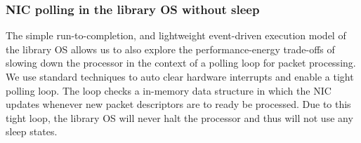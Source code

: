 \subsubsection{NIC polling in the library OS without sleep}
The simple run-to-completion, and lightweight event-driven execution model of the library OS allows us to also explore the performance-energy trade-offs of slowing down the processor in the context of a polling loop for packet processing. We use standard techniques to auto clear hardware interrupts and enable a tight polling loop. The loop checks a in-memory data structure in which the NIC updates whenever new packet descriptors are to ready be processed. Due to this tight loop, the library OS will never halt the processor and thus will not use any sleep states.


